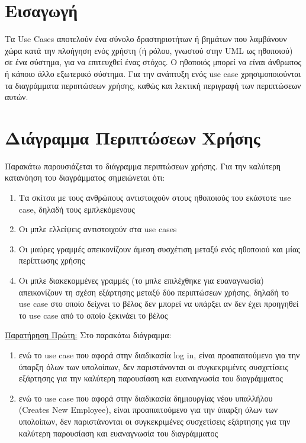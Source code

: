 \documentclass{article}
\begin{document}
{
  \hypersetup{linkcolor=black}
  \tableofcontents
}

\newpage

\section{Εισαγωγή}

Τα Use Cases αποτελούν ένα σύνολο δραστηριοτήτων ή βημάτων που λαμβάνουν χώρα κατά την πλοήγηση ενός χρήστη (ή ρόλου, γνωστού στην UML ως ηθοποιού) σε ένα σύστημα, για να επιτευχθεί ένας στόχος. Ο ηθοποιός μπορεί να είναι άνθρωπος ή κάποιο άλλο εξωτερικό σύστημα. 
Για την ανάπτυξη ενός use case χρησιμοποιούνται τα διαγράμματα περιπτώσεων χρήσης, καθώς και λεκτική περιγραφή των περιπτώσεων αυτών.

\section{Διάγραμμα Περιπτώσεων Χρήσης}

Παρακάτω παρουσιάζεται το διάγραμμα περιπτώσεων χρήσης. Για την καλύτερη κατανόηση του διαγράμματος σημειώνεται ότι:

\begin{enumerate}
  \item Τα σκίτσα με τους ανθρώπους αντιστοιχούν στους ηθοποιούς του εκάστοτε use case, δηλαδή τους εμπλεκόμενους
  \item Οι μπλε ελλείψεις αντιστοιχούν στα use cases
  \item Οι μαύρες γραμμές απεικονίζουν άμεση συσχέτιση μεταξύ ενός ηθοποιού και μίας περίπτωσης χρήσης
  \item Οι μπλε διακεκομμένες γραμμές (το μπλε επιλέχθηκε για ευαναγνωσία) απεικονίζουν τη σχέση εξάρτησης μεταξύ δύο περιπτώσεων χρήσης, δηλαδή το use case στο οποίο δείχνει το βέλος δεν μπορεί να υπάρξει αν δεν έχει προηγηθεί το use case από το οποίο ξεκινάει το βέλος 
\end{enumerate}

\vspace{0.3cm}


\vspace{0.2cm}

\par\underline{Παρατήρηση Πρώτη:} Στο παρακάτω διάγραμμα:
\begin{enumerate}
    \item ενώ το use case που αφορά στην διαδικασία log in, είναι προαπαιτούμενο για την ύπαρξη όλων των υπολοίπων, δεν παριστάνονται οι συγκεκριμένες συσχετίσεις εξάρτησης για την καλύτερη παρουσίαση και ευαναγνωσία του διαγράμματος
    \item ενώ το use case που αφορά στην διαδικασία δημιουργίας νέου υπαλλήλου (Creates New Employee), είναι προαπαιτούμενο για την ύπαρξη όλων των υπολοίπων, δεν παριστάνονται οι συγκεκριμένες συσχετίσεις εξάρτησης για την καλύτερη παρουσίαση και ευαναγνωσία του διαγράμματος
\end{enumerate}
\end{document}
